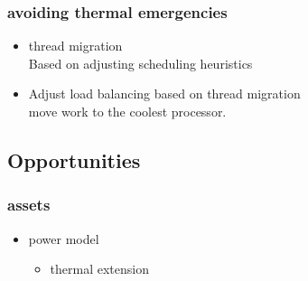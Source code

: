 \documentclass[11pt]{article}
\begin{document}
\subsubsection{avoiding thermal emergencies}
\label{sec-1_3_3}
\begin{itemize}

\item thread migration\\
\label{sec-1_3_3_1}%
Based on adjusting scheduling heuristics 

\item Adjust load balancing based on thread migration\\
\label{sec-1_3_3_2}%
\cite{Coskun2007} move work to the coolest processor.
\end{itemize} %
\subsection{Opportunities}
\label{sec-1_4}
\subsubsection{assets}
\label{sec-1_4_1}
\begin{itemize}

\item power model
\label{sec-1_4_1_1}%
\begin{itemize}

\item thermal extension\\
\label{sec-1_4_1_1_1}%
\end{itemize} %
\end{itemize} %
\end{document}
